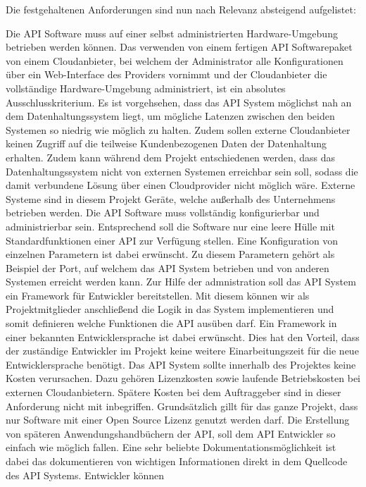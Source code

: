 Die festgehaltenen Anforderungen sind nun nach Relevanz absteigend aufgelistet:
\begin{outline}
  \1 Die API Software muss auf einer selbst administrierten Hardware-Umgebung
  betrieben werden können. Das verwenden von einem fertigen API Softwarepaket
  von einem Cloudanbieter, bei welchem der Administrator alle Konfigurationen
  über ein Web-Interface des Providers vornimmt und der Cloudanbieter die
  vollständige Hardware-Umgebung administriert, ist ein absolutes
  Ausschlusskriterium. Es ist vorgehsehen, dass das API System möglichst nah an
  dem Datenhaltungssystem liegt, um mögliche Latenzen zwischen den beiden
  Systemen so niedrig wie möglich zu halten. Zudem sollen externe Cloudanbieter
  keinen Zugriff auf die teilweise Kundenbezogenen Daten der Datenhaltung
  erhalten. Zudem kann während dem Projekt entschiedenen werden, dass das
  Datenhaltungssystem nicht von externen Systemen erreichbar sein soll, sodass
  die damit verbundene Lösung über einen Cloudprovider nicht möglich wäre.
  Externe Systeme sind in diesem Projekt Geräte, welche außerhalb des
  Unternehmens betrieben werden.
  \1 Die API Software muss vollständig konfigurierbar und administrierbar sein.
  Entsprechend soll die Software nur eine leere Hülle mit Standardfunktionen
  einer API zur Verfügung stellen. Eine Konfiguration von einzelnen Parametern
  ist dabei erwünscht. Zu diesem Parametern gehört als Beispiel der Port, auf
  welchem das API System betrieben und von anderen Systemen erreicht werden
  kann. Zur Hilfe der admnistration soll das API System ein Framework für
  Entwickler bereitstellen. Mit diesem können wir als Projektmitglieder
  anschließend die Logik in das System implementieren und somit definieren
  welche Funktionen die API ausüben darf. Ein Framework in einer bekannten
  Entwicklersprache ist dabei erwünscht. Dies hat den Vorteil, dass der
  zuständige Entwickler im Projekt keine weitere Einarbeitungszeit für die neue
  Entwicklersprache benötigt.
  \1 Das API System sollte innerhalb des Projektes keine Kosten verursachen.
  Dazu gehören Lizenzkosten sowie laufende Betriebskosten bei externen
  Cloudanbietern. Spätere Kosten bei dem Auftraggeber sind in dieser
  Anforderung nicht mit inbegriffen. Grundsätzlich gillt für das ganze Projekt,
  dass nur Software mit einer Open Source Lizenz genutzt werden darf.
  \1 Die Erstellung von späteren Anwendungshandbüchern der API, soll dem API
  Entwickler so einfach wie möglich fallen. Eine sehr beliebte
  Dokumentationsmöglichkeit ist dabei das dokumentieren von wichtigen
  Informationen direkt in dem Quellcode des API Systems. Entwickler können

\end{outline}
